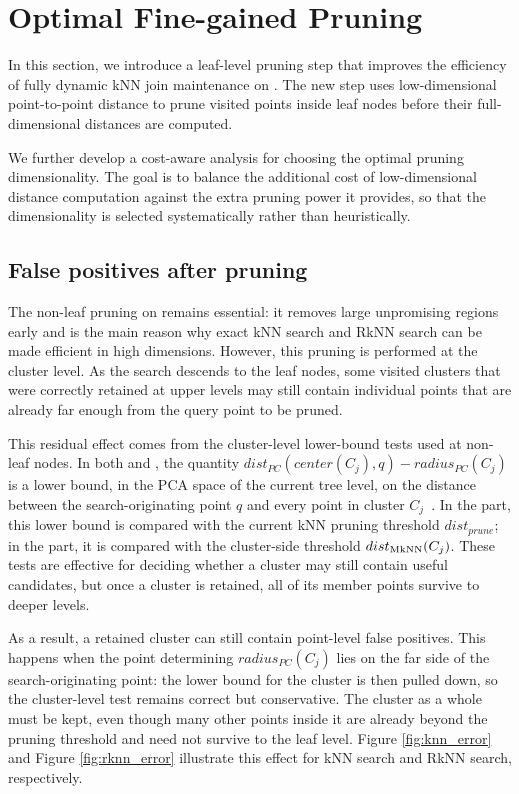 \section{Optimal Fine-gained Pruning}\label{sec:pruning}



In this section, we introduce a leaf-level pruning step that improves the efficiency of fully dynamic kNN join maintenance on \dualtree. The new step uses low-dimensional point-to-point distance to prune visited points inside leaf nodes before their full-dimensional distances are computed.

We further develop a cost-aware analysis for choosing the optimal pruning dimensionality. The goal is to balance the additional cost of low-dimensional distance computation against the extra pruning power it provides, so that the dimensionality is selected systematically rather than heuristically.

\subsection{False positives after pruning}
The non-leaf pruning on \dualtree remains essential: it removes large unpromising regions early and is the main reason why exact kNN search and RkNN search can be made efficient in high dimensions. However, this pruning is performed at the cluster level. As the search descends to the leaf nodes, some visited clusters that were correctly retained at upper levels may still contain individual points that are already far enough from the query point to be pruned.

This residual effect comes from the cluster-level lower-bound tests used at non-leaf nodes. In both \deltatree and \hdrtree, the quantity $dist_{PC}(center(C_j), q)-radius_{PC}(C_j)$ is a lower bound, in the PCA space of the current tree level, on the distance between the search-originating point $q$ and every point in cluster $C_j$~\cite{cui2003contorting,yang2014continuous}. In the \deltatree part, this lower bound is compared with the current kNN pruning threshold $dist_{prune}$; in the \hdrtree part, it is compared with the cluster-side threshold $dist_{\operatorname{MkNN}}(C_j)$. These tests are effective for deciding whether a cluster may still contain useful candidates, but once a cluster is retained, all of its member points survive to deeper levels.

As a result, a retained cluster can still contain point-level false positives. This happens when the point determining $radius_{PC}(C_j)$ lies on the far side of the search-originating point: the lower bound for the cluster is then pulled down, so the cluster-level test remains correct but conservative. The cluster as a whole must be kept, even though many other points inside it are already beyond the pruning threshold and need not survive to the leaf level. Figure \ref{fig:knn_error} and Figure \ref{fig:rknn_error} illustrate this effect for kNN search and RkNN search, respectively.

